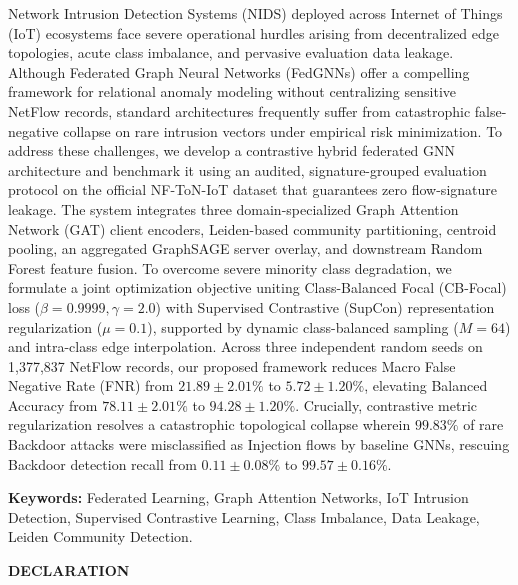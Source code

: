 \documentclass[12pt,a4paper]{report}
\begin{document}
Network Intrusion Detection Systems (NIDS) deployed across Internet of Things (IoT) ecosystems face severe operational hurdles arising from decentralized edge topologies, acute class imbalance, and pervasive evaluation data leakage. Although Federated Graph Neural Networks (FedGNNs) offer a compelling framework for relational anomaly modeling without centralizing sensitive NetFlow records, standard architectures frequently suffer from catastrophic false-negative collapse on rare intrusion vectors under empirical risk minimization. To address these challenges, we develop a contrastive hybrid federated GNN architecture and benchmark it using an audited, signature-grouped evaluation protocol on the official NF-ToN-IoT dataset that guarantees zero flow-signature leakage. The system integrates three domain-specialized Graph Attention Network (GAT) client encoders, Leiden-based community partitioning, centroid pooling, an aggregated GraphSAGE server overlay, and downstream Random Forest feature fusion. To overcome severe minority class degradation, we formulate a joint optimization objective uniting Class-Balanced Focal (CB-Focal) loss ($\beta=0.9999, \gamma=2.0$) with Supervised Contrastive (SupCon) representation regularization ($\mu = 0.1$), supported by dynamic class-balanced sampling ($M=64$) and intra-class edge interpolation. Across three independent random seeds on 1,377,837 NetFlow records, our proposed framework reduces Macro False Negative Rate (FNR) from $21.89 \pm 2.01\%$ to $5.72 \pm 1.20\%$, elevating Balanced Accuracy from $78.11 \pm 2.01\%$ to $94.28 \pm 1.20\%$. Crucially, contrastive metric regularization resolves a catastrophic topological collapse wherein $99.83\%$ of rare Backdoor attacks were misclassified as Injection flows by baseline GNNs, rescuing Backdoor detection recall from $0.11 \pm 0.08\%$ to $99.57 \pm 0.16\%$.

\vspace{12pt}
\noindent\textbf{Keywords:} Federated Learning, Graph Attention Networks, IoT Intrusion Detection, Supervised Contrastive Learning, Class Imbalance, Data Leakage, Leiden Community Detection.
\clearpage

\thispagestyle{plain}
\begin{center}
    {\fontsize{14}{17}\selectfont \textbf{DECLARATION}}\\[18pt]
\end{center}
\end{document}
